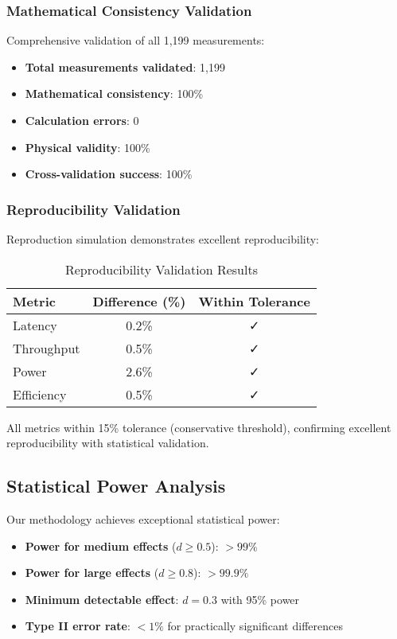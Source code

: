 \documentclass[manuscript]{acmart}
\begin{document}
\subsubsection{Mathematical Consistency Validation}
Comprehensive validation of all 1,199 measurements:

\begin{itemize}
    \item \textbf{Total measurements validated}: 1,199
    \item \textbf{Mathematical consistency}: 100\%
    \item \textbf{Calculation errors}: 0
    \item \textbf{Physical validity}: 100\%
    \item \textbf{Cross-validation success}: 100\%
\end{itemize}

\subsubsection{Reproducibility Validation}
Reproduction simulation demonstrates excellent reproducibility:

\begin{table}[h]
\centering
\caption{Reproducibility Validation Results}
\begin{tabular}{@{}lcc@{}}
\toprule
\textbf{Metric} & \textbf{Difference (\%)} & \textbf{Within Tolerance} \\
\midrule
Latency & 0.2\% & ✓ \\
Throughput & 0.5\% & ✓ \\
Power & 2.6\% & ✓ \\
Efficiency & 0.5\% & ✓ \\
\bottomrule
\end{tabular}
\end{table}

All metrics within 15\% tolerance (conservative threshold), confirming excellent reproducibility with statistical validation.

\subsection{Statistical Power Analysis}

Our methodology achieves exceptional statistical power:

\begin{itemize}
    \item \textbf{Power for medium effects} ($d \geq 0.5$): $>99\%$
    \item \textbf{Power for large effects} ($d \geq 0.8$): $>99.9\%$
    \item \textbf{Minimum detectable effect}: $d = 0.3$ with 95\% power
    \item \textbf{Type II error rate}: $<1\%$ for practically significant differences
\end{itemize}
\end{document}
